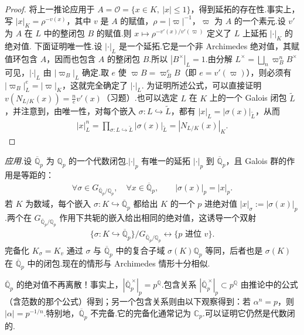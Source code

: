 \begin{proof}
将上一推论应用于 $A=\mathcal O=\{x\in K,\ |x|\le1\}$，得到延拓的存在性.事实上，写 $|x|_K=\rho^{-v(x)}$，其中 $v$ 是 $A$ 的赋值，$\rho=|\varpi|^{-1}$，$\varpi$ 为 $A$ 的一个素元.设 $v'$ 为 $A$ 在 $L$ 中的整闭包 $B$ 的赋值.则 $x\longmapsto\rho^{-v'(x)/v'(\varpi)}$ 定义了 $L$ 上延拓 $|\cdot|_K$ 的绝对值.
下面证明唯一性.设 $|\cdot|_L$ 是一个延拓.它是一个非 Archimedes 绝对值，其赋值环包含 $A$，因而也包含 $A$ 的整闭包 $B$.所以 $|B^\times|_L=1$.由分解 $L^\times=\bigsqcup_n\varpi_B^nB^\times$ 可见，$|\cdot|_L$ 由 $|\varpi_B|_L$ 确定.取 $e$ 使 $\varpi B=\varpi_B^eB$（即 $e=v'(\varpi)$），则必须有 $|\varpi_B|_L^e=|\varpi|_K$，这就完全确定了 $|\cdot|_L$.
为证明所述公式，可以直接证明 $v(N_{L/K}(x))=\frac ne v'(x)$（习题）.也可以选定 $L$ 在 $K$ 上的一个 Galois 闭包 $\widetilde L$，并注意到，由唯一性，对每个嵌入 $\sigma\colon L\hookrightarrow\widetilde L$，都有 $|x|_L=|\sigma(x)|_{\widetilde L}$，从而
\begin{align*}
|x|_L^n=\prod_{\sigma\colon L\hookrightarrow\widetilde L}|\sigma(x)|_{\widetilde L}
=|N_{L/K}(x)|_K.
\end{align*}
\end{proof}
\emph{应用.}设 $\overline{\mathbb Q}_p$ 为 $\mathbb Q_p$ 的一个代数闭包.$|\cdot|_p$ 有唯一的延拓 $|\cdot|_p$ 到 $\overline{\mathbb Q}_p$，且 Galois 群的作用是等距的：
\begin{align*}
\forall\sigma\in G_{\overline{\mathbb Q}_p/\mathbb Q_p},\quad
\forall x\in\overline{\mathbb Q}_p,\qquad |\sigma(x)|_p=|x|_p.
\end{align*}
若 $K$ 为数域，每个嵌入 $\sigma\colon K\hookrightarrow\overline{\mathbb Q}_p$ 都给出 $K$ 的一个 $p$ 进绝对值 $|x|_\sigma:=|\sigma(x)|_p$.两个在 $G_{\overline{\mathbb Q}_p/\mathbb Q_p}$ 作用下共轭的嵌入给出相同的绝对值，这诱导一个双射
\begin{align*}
\{\sigma\colon K\hookrightarrow\overline{\mathbb Q}_p\}/G_{\overline{\mathbb Q}_p/\mathbb Q_p}
\longleftrightarrow\{p\text{ 进位 }v\}.
\end{align*}
完备化 $K_\sigma=K_v$ 通过 $\sigma$ 与 $\overline{\mathbb Q}_p$ 中的复合子域 $\sigma(K)\mathbb Q_p$ 等同，后者也是 $\sigma(K)$ 在 $\overline{\mathbb Q}_p$ 中的闭包.现在的情形与 Archimedes 情形十分相似.
\begin{remark*}
$\overline{\mathbb Q}_p$ 的绝对值不再离散！事实上，$|\overline{\mathbb Q}_p^{\,\times}|_p=p^{\mathbb Q}$.包含关系 $|\overline{\mathbb Q}_p^{\,\times}|_p\subset p^{\mathbb Q}$ 由推论中的公式（含范数的那个公式）得到；另一个包含关系则由以下观察得到：若 $\alpha^n=p$，则 $|\alpha|=p^{-1/n}$.特别地，$\overline{\mathbb Q}_p$ 不完备.它的完备化通常记为 $\mathbb C_p$.可以证明它仍然是代数闭的.
\end{remark*}

